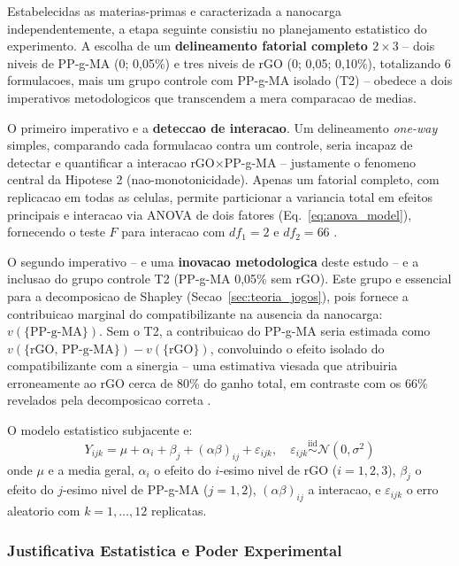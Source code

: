 \documentclass[11pt,a4paper,oneside]{article}
\begin{document}
Estabelecidas as materias-primas e caracterizada a nanocarga independentemente, a etapa seguinte
consistiu no planejamento estatistico do experimento. A escolha de um {\bfseries delineamento
fatorial completo $2{\times}3$} -- dois niveis de PP-g-MA (0; 0,05\%) e tres niveis de rGO (0;
0,05; 0,10\%), totalizando 6 formulacoes, mais um grupo controle com PP-g-MA isolado (T2) --
obedece a dois imperativos metodologicos que transcendem a mera comparacao de medias.

O primeiro imperativo e a {\bfseries deteccao de interacao}. Um delineamento \textit{one-way}
simples, comparando cada formulacao contra um controle, seria incapaz de detectar e quantificar
a interacao rGO$\times$PP-g-MA -- justamente o fenomeno central da Hipotese 2 (nao-monotonicidade).
Apenas um fatorial completo, com replicacao em todas as celulas, permite particionar a variancia
total em efeitos principais e interacao via ANOVA de dois fatores (Eq.~\ref{eq:anova_model}),
fornecendo o teste $F$ para interacao com $df_1{=}2$ e $df_2{=}66$ \cite{Montgomery2020}.

O segundo imperativo -- e uma {\bfseries inovacao metodologica} deste estudo -- e a inclusao do
grupo controle T2 (PP-g-MA 0,05\% sem rGO). Este grupo e essencial para a decomposicao de
Shapley (Secao~\ref{sec:teoria_jogos}), pois fornece a contribuicao marginal do compatibilizante
na ausencia da nanocarga: $v(\{\text{PP-g-MA}\})$. Sem o T2, a contribuicao do PP-g-MA seria
estimada como $v(\{\text{rGO, PP-g-MA}\}){-}v(\{\text{rGO}\})$, convoluindo o efeito isolado
do compatibilizante com a sinergia -- uma estimativa viesada que atribuiria erroneamente ao
rGO cerca de 80\% do ganho total, em contraste com os 66\% revelados pela decomposicao correta
\cite{Shapley1953}.

O modelo estatistico subjacente e:
\begin{equation}
Y_{ijk} = \mu + \alpha_i + \beta_j + (\alpha\beta)_{ij} + \varepsilon_{ijk},\quad \varepsilon_{ijk} \stackrel{\text{iid}}{\sim} \mathcal{N}(0,\sigma^2)
\label{eq:anova_model}
\end{equation}
onde $\mu$ e a media geral, $\alpha_i$ o efeito do $i$-esimo nivel de rGO ($i{=}1,2,3$),
$\beta_j$ o efeito do $j$-esimo nivel de PP-g-MA ($j{=}1,2$), $(\alpha\beta)_{ij}$ a interacao,
e $\varepsilon_{ijk}$ o erro aleatorio com $k{=}1,\dots,12$ replicatas.

\subsubsection{Justificativa Estatistica e Poder Experimental}
\end{document}
